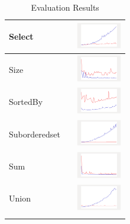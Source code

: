 \begin{longtable}{ m{2.5cm} m{8cm} m{2cm} }
Select &

&
\includegraphics[width=2cm]{graphs/orderedset/small/Select}
\\\hline

Size &

&
\includegraphics[width=2cm]{graphs/orderedset/small/Size}
\\\hline

SortedBy &

&
\includegraphics[width=2cm]{graphs/orderedset/small/sortedBy}
\\\hline

Suborderedset &

&
\includegraphics[width=2cm]{graphs/orderedset/small/Suborderedset}
\\\hline

Sum &

&
\includegraphics[width=2cm]{graphs/orderedset/small/Sum}
\\\hline

Union &

&
\includegraphics[width=2cm]{graphs/orderedset/small/Union}
\\\hline
  
\caption{Evaluation Results }
\label{tab:resultsFull}
\end{longtable}


